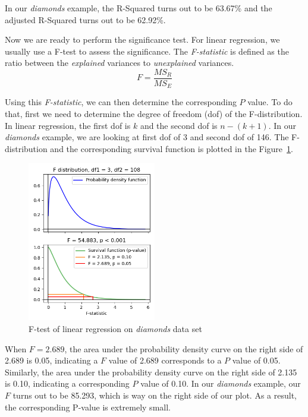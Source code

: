 \documentclass[
	letterpaper
]{article}
\begin{document}
In our \textit{diamonds} example, the R-Squared turns out to be 63.67\% and the adjusted R-Squared turns out to be 62.92\%.

Now we are ready to perform the significance test.
For linear regression, we usually use a F-test to assess the significance.
The \textit{F-statistic} is defined as the ratio between the \textit{explained} variances to \textit{unexplained} variances.
\begin{equation}
F = \frac{MS_R}{MS_E}
\end{equation}

Using this \textit{F-statistic}, we can then determine the corresponding $P$ value.
To do that, first we need to determine the degree of freedom (dof) of the F-distribution.
In linear regression, the first dof is $k$ and the second dof is $n - (k+1)$.
In our \textit{diamonds} example, we are looking at first dof of 3 and second dof of 146.
The F-distribution and the corresponding survival function is plotted in the Figure~\ref{fig:f-test}.
\begin{figure}[htbp]
	\centering
	\includegraphics[width=0.5\textwidth]{figures/f-test.png}
	\caption{F-test of linear regression on \textit{diamonds} data set}
	\label{fig:f-test}
\end{figure}

When $F=2.689$, the area under the probability density curve on the right side of 2.689 is 0.05, indicating a $F$ value of 2.689 corresponds to a $P$ value of 0.05.
Similarly, the area under the probability density curve on the right side of 2.135 is 0.10, indicating a corresponding $P$ value of 0.10.
In our \textit{diamonds} example, our $F$ turns out to be 85.293, which is way on the right side of our plot.
As a result, the corresponding P-value is extremely small.
\end{document}
